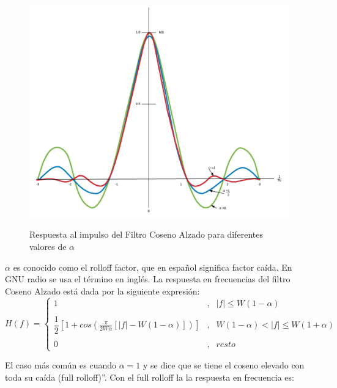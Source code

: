 \begin{figure}[h!]
	\captionsetup{justification = raggedright, singlelinecheck = false}
	\caption{Respuesta al impulso del Filtro Coseno Alzado para diferentes valores de $\alpha$} 
	\centering
	\includegraphics[scale=0.3]{Imagenes/Seno.png}
	\label{fig:Seno}
\end{figure}

$ \alpha $ es conocido como el rolloff factor, que en español significa factor caída. En GNU radio se usa el término en inglés. La respuesta en frecuencias del filtro Coseno Alzado está dada por la siguiente expresión: \\

\begin{equation} \label{capcuatro_veinte}
H(f)=\left \{ \begin{matrix}
1 &, & |f|  \leq W(1- \alpha) \\
\\ 
\dfrac{1}{2} [1+cos(\frac{\pi}{2W \alpha}[|f|-W(1-\alpha)])] & , & W (1- \alpha)  <  |f| \leq W(1+\alpha) \\
 \\
0 & , & resto
 
\end{matrix} \right.
\end{equation}

El caso más común es cuando $\alpha = 1 $ y se dice que se tiene el coseno elevado con toda su caída (full rolloff)”. Con el full rolloff la la respuesta en frecuencia es: \\


